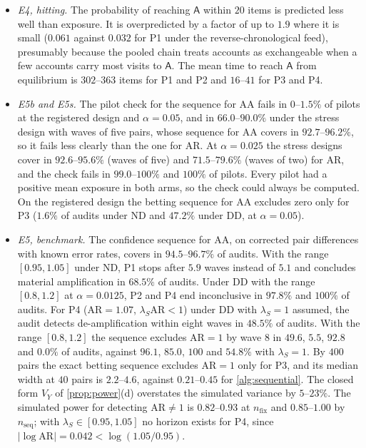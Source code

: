 \begin{itemize}
  \item \emph{E4, hitting.} The probability of reaching $\mathsf A$ within $20$ items is predicted less well than exposure. It is overpredicted by a factor of up to $1.9$ where it is small ($0.061$ against $0.032$ for P1 under the reverse-chronological feed), presumably because the pooled chain treats accounts as exchangeable when a few accounts carry most visits to $\mathsf A$. The mean time to reach $\mathsf A$ from equilibrium is $302$--$363$ items for P1 and P2 and $16$--$41$ for P3 and P4.
  \item \emph{E5b and E5s.} The pilot check for the sequence for $\mathrm{AA}$ fails in $0$--$1.5\%$ of pilots at the registered design and $\alpha=0.05$, and in $66.0$--$90.0\%$ under the stress design with waves of five pairs, whose sequence for $\mathrm{AA}$ covers in $92.7$--$96.2\%$, so it fails less clearly than the one for $\mathrm{AR}$. At $\alpha=0.025$ the stress designs cover in $92.6$--$95.6\%$ (waves of five) and $71.5$--$79.6\%$ (waves of two) for $\mathrm{AR}$, and the check fails in $99.0$--$100\%$ and $100\%$ of pilots. Every pilot had a positive mean exposure in both arms, so the check could always be computed. On the registered design the betting sequence for $\mathrm{AA}$ excludes zero only for P3 ($1.6\%$ of audits under ND and $47.2\%$ under DD, at $\alpha=0.05$).
  \item \emph{E5, benchmark.} The confidence sequence for $\mathrm{AA}$, on corrected pair differences with known error rates, covers in $94.5$--$96.7\%$ of audits. With the range $[0.95,1.05]$ under ND, P1 stops after $5.9$ waves instead of $5.1$ and concludes material amplification in $68.5\%$ of audits. Under DD with the range $[0.8,1.2]$ at $\alpha=0.0125$, P2 and P4 end inconclusive in $97.8\%$ and $100\%$ of audits. For P4 ($\mathrm{AR}=1.07$, $\lambda_S\mathrm{AR}<1$) under DD with $\lambda_S=1$ assumed, the audit detects de-amplification within eight waves in $48.5\%$ of audits. With the range $[0.8,1.2]$ the sequence excludes $\mathrm{AR}=1$ by wave $8$ in $49.6$, $5.5$, $92.8$ and $0.0\%$ of audits, against $96.1$, $85.0$, $100$ and $54.8\%$ with $\lambda_S=1$. By $400$ pairs the exact betting sequence excludes $\mathrm{AR}=1$ only for P3, and its median width at $40$ pairs is $2.2$--$4.6$, against $0.21$--$0.45$ for \cref{alg:sequential}. The closed form $V_Y$ of \cref{prop:power}(d) overstates the simulated variance by $5$--$23\%$. The simulated power for detecting $\mathrm{AR}\ne1$ is $0.82$--$0.93$ at $n_{\mathrm{fix}}$ and $0.85$--$1.00$ by $n_{\mathrm{seq}}$; with $\lambda_S\in[0.95,1.05]$ no horizon exists for P4, since $|\log\mathrm{AR}|=0.042<\log(1.05/0.95)$.
\end{itemize}

